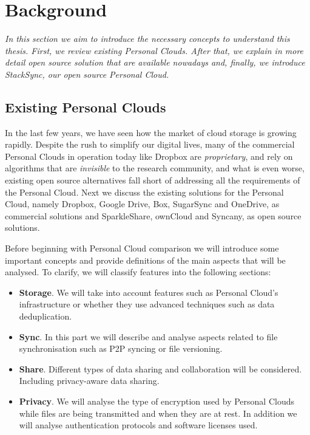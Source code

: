 \chapter{Background}

\emph{In this section we aim to introduce the necessary concepts to understand this thesis.
First, we review existing Personal Clouds. After that, we explain in more detail 
open source solution that are available nowadays and, finally, we introduce StackSync,
our open source Personal Cloud.}

\section{Existing Personal Clouds}

In the last few years, we have seen how the market of cloud storage is growing rapidly. 
Despite the rush to simplify our digital lives, many of the commercial Personal Clouds
in operation today like Dropbox are \textit{proprietary}, and rely on algorithms that are
\textit{invisible} to the research community, and what is even worse, existing open source
alternatives fall short of addressing all the requirements of the Personal Cloud.
Next we discuss the existing solutions for the Personal Cloud, namely
Dropbox, Google Drive, Box, SugarSync and OneDrive, as commercial solutions and 
SparkleShare, ownCloud and Syncany, as open source solutions.

Before beginning with Personal Cloud comparison we will introduce some important concepts
and provide definitions of the main aspects that will be analysed. To clarify, we will
classify features into the following sections:

\begin{itemize}
\item \textbf{Storage}. We will take into account features such as Personal Cloud's infrastructure or whether they use advanced techniques such as data deduplication.
\item \textbf{Sync}. In this part we will describe and analyse aspects related to file synchronisation such as P2P syncing or file versioning. 
\item \textbf{Share}. Different types of data sharing and collaboration will be considered. Including privacy-aware data sharing.
\item \textbf{Privacy}. We will analyse the type of encryption used by Personal Clouds while files are being transmitted and when they are at rest. In addition we will analyse authentication protocols and software licenses used.
\end{itemize}


